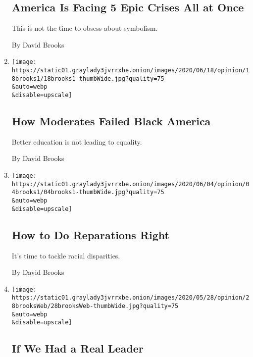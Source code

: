\begin{enumerate}
  \hypertarget{america-is-facing-5-epic-crises-all-at-once}{%
  \subsection{America Is Facing 5 Epic Crises All at
  Once}\label{america-is-facing-5-epic-crises-all-at-once}}

  This is not the time to obsess about symbolism.

  By David Brooks
\item
  \href{/2020/06/18/opinion/black-america-education.html}{}

  \texttt{[image: https://static01.graylady3jvrrxbe.onion/images/2020/06/18/opinion/18brooks1/18brooks1-thumbWide.jpg?quality=75\\\&auto=webp\\\&disable=upscale]}

  \hypertarget{how-moderates-failed-black-america}{%
  \subsection{How Moderates Failed Black
  America}\label{how-moderates-failed-black-america}}

  Better education is not leading to equality.

  By David Brooks
\item
  \href{/2020/06/04/opinion/united-states-reparations.html}{}

  \texttt{[image: https://static01.graylady3jvrrxbe.onion/images/2020/06/04/opinion/04brooks1/04brooks1-thumbWide.jpg?quality=75\\\&auto=webp\\\&disable=upscale]}

  \hypertarget{how-to-do-reparations-right}{%
  \subsection{How to Do Reparations
  Right}\label{how-to-do-reparations-right}}

  It's time to tackle racial disparities.

  By David Brooks
\item
  \href{/2020/05/28/opinion/coronavirus-trump.html}{}

  \texttt{[image: https://static01.graylady3jvrrxbe.onion/images/2020/05/28/opinion/28brooksWeb/28brooksWeb-thumbWide.jpg?quality=75\\\&auto=webp\\\&disable=upscale]}

  \hypertarget{if-we-had-a-real-leader}{%
  \subsection{If We Had a Real Leader}\label{if-we-had-a-real-leader}}


\end{enumerate}
